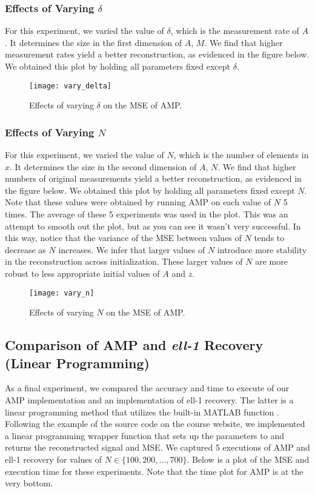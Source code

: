 \documentclass[]{../../ncmathy}
\begin{document}
	\pagebreak
	\subsubsection{Effects of Varying $\delta$} \label{variedDelta}
			For this experiment, we varied the value of $\delta$, which is the measurement rate of $A$. It determines the size in the first dimension of $A$, $M$. We find that higher measurement rates yield a better reconstruction, as evidenced in the figure below. We obtained this plot by holding all parameters fixed except $\delta$.
		
		\begin{figure}[H]
		\centering\texttt{[image: vary\_delta]}
		\caption{Effects of varying $\delta$ on the MSE of AMP.}
		\end{figure}		
	
	\subsubsection{Effects of Varying $N$}
			For this experiment, we varied the value of $N$, which is the number of elements in $x$. It determines the size in the second dimension of $A$, $N$. We find that higher numbers of original measurements yield a better reconstruction, as evidenced in the figure below. We obtained this plot by holding all parameters fixed except $N$. Note that these values were obtained by running AMP on each value of $N$ 5 times. The average of these 5 experiments was used in the plot. This was an attempt to smooth out the plot, but as you can see it wasn't very successful. In this way, notice that the variance of the MSE between values of $N$ tends to decrease as $N$ increases. We infer that larger values of $N$ introduce more stability in the reconstruction across initialization. These larger values of $N$ are more robust to less appropriate initial values of $A$ and $z$.
		
		\begin{figure}[H]
		\centering\texttt{[image: vary\_n]}
		\caption{Effects of varying $N$ on the MSE of AMP.}
		\end{figure}		
		

\subsection{Comparison of AMP and \textit{ell-1} Recovery (Linear Programming)}
	As a final experiment, we compared the accuracy and time to execute of our AMP implementation and an implementation of ell-1 recovery. The latter is a linear programming method that utilizes the built-in MATLAB function . Following the example of the source code on the course website, we implemented a linear programming wrapper function that sets up the parameters to  and returns the reconstructed signal and MSE. We captured 5 executions of AMP and ell-1 recovery for values of $N \in \{100, 200, ... , 700\}$. Below is a plot of the MSE and execution time for these experiments. Note that the time plot for AMP is at the very bottom. 
	
\end{document}
